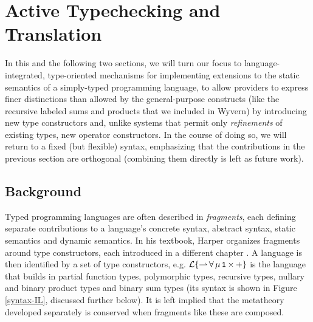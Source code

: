 \newcommand{\rulename}[1]{({\textsc{\textsl{#1}}})}
\newcommand{\keyrule}{{\color{red}~$\star$}}
\newcommand{\minput}{}
\newcommand{\moutput}{^{\color{gray}{+}}}




\section{Active Typechecking and Translation}
In this and the following two sections, we will turn our focus to language-integrated, type-oriented mechanisms for implementing extensions to the static semantics of a simply-typed programming language, to allow providers to express finer distinctions than allowed by the general-purpose constructs (like the recursive labeled sums and products that we included in Wyvern) by introducing new type constructors and, unlike systems that permit only \emph{refinements} of existing types, new operator constructors. In the course of doing so, we will return to a  fixed (but flexible) syntax, emphasizing that the contributions in the previous section are orthogonal (combining them directly is left as future work). %

\subsection{Background}
Typed programming languages are often described in \emph{fragments}, each defining separate contributions to a language's concrete syntax, abstract syntax, static semantics and dynamic semantics. 
In his textbook, Harper organizes fragments around type constructors, each introduced in a different chapter \cite{pfpl}. A language is then identified by a set of type constructors, e.g. $\mathcal{L}\{{\rightharpoonup}\,{\forall}\,{\mu}\,{\texttt{\textbf{1}}}\,{\times}\,{+}\}$ is the language that builds in partial function types,  polymorphic types, recursive types, nullary and binary product types and binary sum types (its syntax is shown in Figure \ref{syntax-IL}, discussed further below).
It is left implied that the metatheory developed separately is conserved when fragments like these are composed.  

